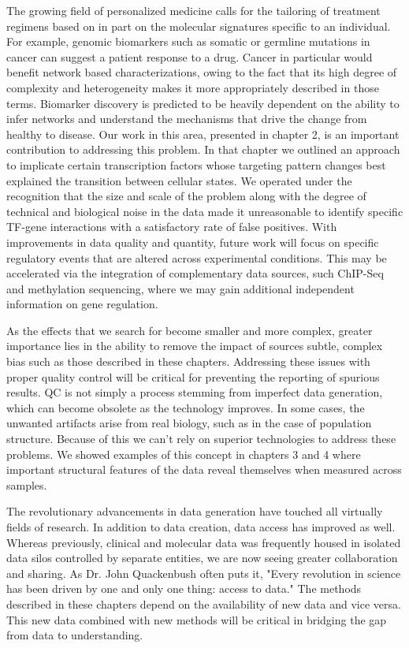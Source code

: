 The growing field of personalized medicine calls for the tailoring of treatment regimens based on in part on the molecular signatures specific to an individual.  For example, genomic biomarkers such as somatic or germline mutations in cancer can suggest a patient response to a drug. Cancer in particular would benefit network based characterizations, owing to the fact that its high degree of complexity and heterogeneity makes it more appropriately described in those terms. Biomarker discovery is predicted to be heavily dependent on the ability to infer networks and understand the mechanisms that drive the change from healthy to disease.  Our work in this area, presented in chapter 2, is an important contribution to addressing this problem. In that chapter we outlined an approach to implicate certain transcription factors whose targeting pattern changes best explained the transition between cellular states. We operated under the recognition that the size and scale of the problem along with the degree of technical and biological noise in the data made it unreasonable to identify specific TF-gene interactions with a satisfactory rate of false positives. With improvements in data quality and quantity, future work will focus on specific regulatory events that are altered across experimental conditions.  This may be accelerated via the integration of complementary data sources, such ChIP-Seq and methylation sequencing, where we may gain additional independent information on gene regulation.

As the effects that we search for become smaller and more complex, greater importance lies in the ability to remove the impact of sources subtle, complex bias such as those described in these chapters. Addressing these issues with proper quality control will be critical for preventing the reporting of spurious results. QC is not simply a process stemming from imperfect data generation, which can become obsolete as the technology improves. In some cases, the unwanted artifacts arise from real biology, such as in the case of population structure. Because of this we can't rely on superior technologies to address these problems. We showed examples of this concept in chapters 3 and 4 where important structural features of the data reveal themselves when measured across samples. 

The revolutionary advancements in data generation have touched all virtually fields of research.  In addition to data creation, data access has improved as well.  Whereas previously, clinical and molecular data was frequently housed in isolated data silos controlled by separate entities, we are now seeing greater collaboration and sharing. As Dr. John Quackenbush often puts it, "Every revolution in science has been driven by one and only one thing: access to data." The methods described in these chapters depend on the availability of new data and vice versa.  This new data combined with new methods will be critical in bridging the gap from data to understanding.